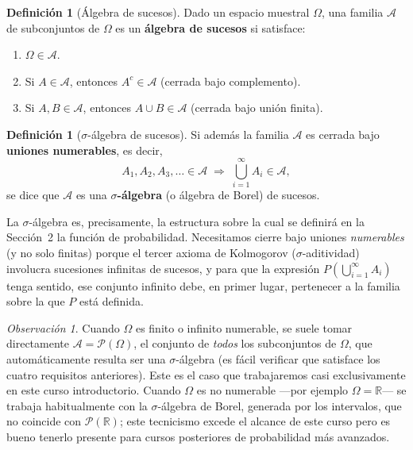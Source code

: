 \documentclass[11pt,a4paper]{article}
\theoremstyle{plain}
\theoremstyle{definition}
\newtheorem{definicion}[teorema]{Definición}
\theoremstyle{remark}
\newtheorem{observacion}[teorema]{Observación}
\begin{document}
\begin{definicion}[Álgebra de sucesos]
Dado un espacio muestral $\Omega$, una familia $\mathcal{A}$ de subconjuntos de $\Omega$ es un \textbf{álgebra de sucesos} si satisface:
\begin{enumerate}
\item $\Omega \in \mathcal{A}$.
\item Si $A \in \mathcal{A}$, entonces $A^c \in \mathcal{A}$ (cerrada bajo complemento).
\item Si $A, B \in \mathcal{A}$, entonces $A \cup B \in \mathcal{A}$ (cerrada bajo unión finita).
\end{enumerate}
\end{definicion}

\begin{definicion}[$\sigma$-álgebra de sucesos]
Si además la familia $\mathcal{A}$ es cerrada bajo \textbf{uniones numerables}, es decir,
\[
A_1, A_2, A_3, \dots \in \mathcal{A} \;\Longrightarrow\; \bigcup_{i=1}^{\infty} A_i \in \mathcal{A},
\]
se dice que $\mathcal{A}$ es una \textbf{$\sigma$-álgebra} (o álgebra de Borel) de sucesos.
\end{definicion}

La $\sigma$-álgebra es, precisamente, la estructura sobre la cual se definirá en la Sección~2 la función de probabilidad. Necesitamos cierre bajo uniones \emph{numerables} (y no solo finitas) porque el tercer axioma de Kolmogorov ($\sigma$-aditividad) involucra sucesiones infinitas de sucesos, y para que la expresión $P\left(\bigcup_{i=1}^\infty A_i\right)$ tenga sentido, ese conjunto infinito debe, en primer lugar, pertenecer a la familia sobre la que $P$ está definida.

\begin{observacion}
Cuando $\Omega$ es finito o infinito numerable, se suele tomar directamente $\mathcal{A} = \mathcal{P}(\Omega)$, el conjunto de \emph{todos} los subconjuntos de $\Omega$, que automáticamente resulta ser una $\sigma$-álgebra (es fácil verificar que satisface los cuatro requisitos anteriores). Este es el caso que trabajaremos casi exclusivamente en este curso introductorio. Cuando $\Omega$ es no numerable —por ejemplo $\Omega = \mathbb{R}$— se trabaja habitualmente con la $\sigma$-álgebra de Borel, generada por los intervalos, que no coincide con $\mathcal{P}(\mathbb{R})$; este tecnicismo excede el alcance de este curso pero es bueno tenerlo presente para cursos posteriores de probabilidad más avanzados.
\end{observacion}
\end{document}
